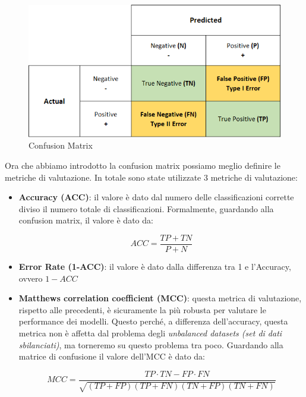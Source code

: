 \begin{figure}[H]
    \centering
    \includegraphics[width=0.5\linewidth]{confusion_matrix.png}
    \caption{Confusion Matrix}
    \label{fig:enter-label}
\end{figure}

Ora che abbiamo introdotto la confusion matrix possiamo meglio definire le metriche di valutazione. In totale sono state utilizzate 3 metriche di valutazione:

\begin{itemize}

  \item \textbf{Accuracy (ACC)}: il valore \`e dato dal numero delle classificazioni corrette diviso il numero totale di classificazioni. Formalmente, guardando alla confusion matrix, il valore \`e dato da:

  \begin{equation}
    ACC = \frac{TP + TN}{P + N}
  \end{equation}
  
  \item \textbf{Error Rate (1-ACC)}: il valore \`e dato dalla differenza tra 1 e l'Accuracy, ovvero $1-ACC$
  
  \item \textbf{Matthews correlation coefficient (MCC)}: questa metrica di valutazione, rispetto alle precedenti, \`e sicuramente la pi\`u robusta per valutare le performance dei modelli. Questo perch\'e, a differenza dell'accuracy, questa metrica non \`e affetta dal problema degli \textit{unbalanced datasets (set di dati sbilanciati)}, ma torneremo su questo problema tra poco. Guardando alla matrice di confusione il valore dell'MCC \`e dato da:
  
  \begin{equation}
      MCC = \frac{TP \cdot TN - FP \cdot FN}{\sqrt{(TP + FP)(TP + FN)(TN + FP)(TN + FN)}}
  \end{equation}
\end{itemize}

\vspace{1.5cm}

